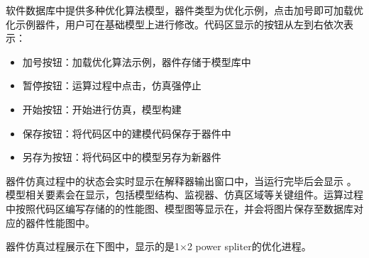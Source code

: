 \documentclass[a4paper,10pt,english]{sphinxmanual}
\begin{document}
{{\sphinxAtStartPar
{}





\sphinxAtStartPar
软件数据库中提供多种优化算法模型，器件类型为优化示例，点击加号即可加载优化示例器件，用户可在基础模型上进行修改。代码区显示的按钮从左到右依次表示：
\begin{itemize}
\item {} 
\sphinxAtStartPar
加号按钮：加载优化算法示例，器件存储于模型库中

\item {} 
\sphinxAtStartPar
暂停按钮：运算过程中点击，仿真强停止

\item {} 
\sphinxAtStartPar
开始按钮：开始进行仿真，模型构建

\item {} 
\sphinxAtStartPar
保存按钮：将代码区中的建模代码保存于器件中

\item {} 
\sphinxAtStartPar
另存为按钮：将代码区中的模型另存为新器件

\end{itemize}

\sphinxAtStartPar
器件仿真过程中的状态会实时显示在解释器输出窗口中，当运行完毕后会显示 。模型相关要素会在显示，包括模型结构、监视器、仿真区域等关键组件。运算过程中按照代码区编写存储的的性能图、模型图等显示在，并会将图片保存至数据库对应的器件性能图中。

\sphinxAtStartPar
器件仿真过程展示在下图中，显示的是1×2 power spliter的优化进程。


\sphinxAtStartPar
\sphinxincludegraphics{{软件模块介绍/优化算法/assets/%






\subsection{优化算法tips}
\label{\detokenize{_u8f6f_u4ef6_u6a21_u5757_u4ecb_u7ecd/_u4f18_u5316_u7b97_u6cd5/contents:tips}}
\sphinxAtStartPar
因软件还在开发阶段，用户搭建模型需按照已给定的实例进行改写，或者使用软件提供的API进行模型构建：
\begin{itemize}
\item {} 
\sphinxAtStartPar
用户需按照API规则进行模型构建，对于监视器、模型构建等关键建模语句需提供必要的参数等


\end{itemize}}}}}
\end{document}
